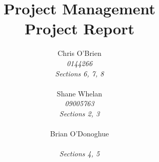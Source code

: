 \documentclass[a4paper,12pt,fleqn]{report}
\begin{document}
\title{Project Management  \\ Project Report}
\author{Chris O'Brien \\ \textit{0144266} \\ \textit{Sections 6, 7, 8}\\ \\ Shane Whelan \\ \textit{09005763} \\ \textit{Sections 2, 3}\\ \\ Brian O'Donoghue \\ \textit{} \\ \textit{Sections 4, 5} \\}
\maketitle  
%
%
\tableofcontents

%
%
\listoffigures

%
%
\listoftables









\printbibliography[title={References}]
\end{document}

